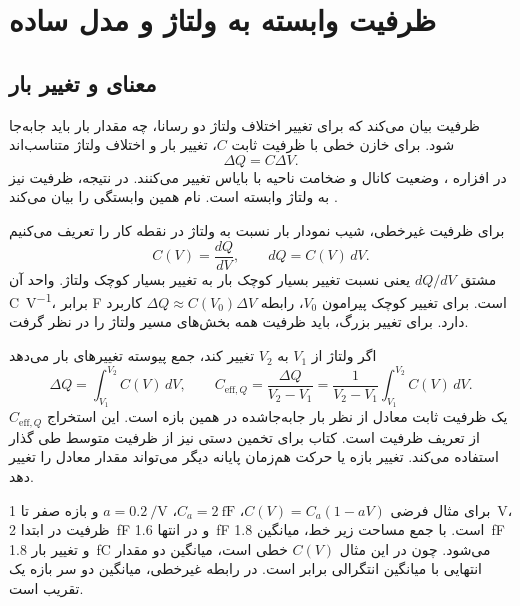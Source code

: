 \section{ظرفیت وابسته به ولتاژ و مدل ساده }
\subsection{معنای  و تغییر بار}
ظرفیت بیان می‌کند که برای تغییر اختلاف ولتاژ دو رسانا، چه مقدار بار باید جابه‌جا
شود. برای خازن خطی با ظرفیت ثابت \(C\)، تغییر بار و اختلاف ولتاژ متناسب‌اند
\begin{equation}
 \Delta Q=C\Delta V.
 \label{eq:cv-linear-charge}
\end{equation}
در افزاره ، وضعیت کانال و ضخامت ناحیه  با بایاس تغییر
می‌کنند. در نتیجه، ظرفیت نیز به ولتاژ وابسته است. نام 
همین وابستگی را بیان می‌کند \cite[آغاز بخش ]{weste}.

برای ظرفیت غیرخطی، شیب نمودار بار نسبت به ولتاژ در نقطه کار را تعریف می‌کنیم
\begin{equation}
 C(V)=\frac{dQ}{dV},\qquad dQ=C(V)\,dV.
 \label{eq:cv-differential}
\end{equation}
مشتق \(dQ/dV\) یعنی نسبت تغییر بسیار کوچک بار به تغییر بسیار کوچک ولتاژ.
واحد آن \unit{\coulomb\per\volt}، برابر \unit{\farad} است.
برای تغییر کوچک پیرامون \(V_0\)، رابطه
\(\Delta Q\approx C(V_0)\Delta V\) کاربرد دارد.
برای تغییر بزرگ، باید ظرفیت همه بخش‌های مسیر ولتاژ را در نظر گرفت.

اگر ولتاژ از \(V_1\) به \(V_2\) تغییر کند، جمع پیوسته تغییرهای بار می‌دهد
\begin{equation}
 \Delta Q=\int_{V_1}^{V_2}C(V)\,dV,\qquad
 C_{\mathrm{eff},Q}=\frac{\Delta Q}{V_2-V_1}
 =\frac1{V_2-V_1}\int_{V_1}^{V_2}C(V)\,dV.
 \label{eq:cv-charge-equivalent}
\end{equation}
\(C_{\mathrm{eff},Q}\) یک ظرفیت ثابت معادل از نظر بار جابه‌جاشده در همین بازه است.
این استخراج از تعریف ظرفیت است. کتاب برای تخمین دستی نیز از ظرفیت متوسط
طی گذار استفاده می‌کند. تغییر بازه یا حرکت هم‌زمان پایانه دیگر می‌تواند مقدار
معادل را تغییر دهد.

برای مثال فرضی \(C(V)=C_a(1-aV)\)، \(C_a=\qty{2}{\femto\farad}\)،
\(a=\qty{0.2}{\per\volt}\) و بازه صفر تا \qty{1}{\volt}، ظرفیت در ابتدا
\qty{2}{\femto\farad} و در انتها \qty{1.6}{\femto\farad} است.
با جمع مساحت زیر خط، میانگین \qty{1.8}{\femto\farad} و تغییر بار
\qty{1.8}{\femto\coulomb} می‌شود. چون در این مثال \(C(V)\) خطی است، میانگین
دو مقدار انتهایی با میانگین انتگرالی برابر است.
در رابطه غیرخطی، میانگین دو سر بازه یک تقریب است.

